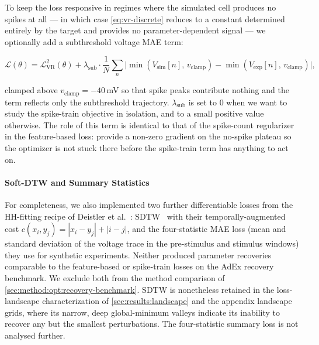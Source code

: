 To keep the loss responsive in regimes where the simulated cell produces no spikes at all --- in which case \cref{eq:vr-discrete} reduces to a constant determined entirely by the target and provides no parameter-dependent signal --- we optionally add a subthreshold voltage \gls{MAE} term:
\begin{strip}
\begin{equation}\label{eq:vr-sub}
    \mathcal{L}(\theta) = \mathcal{L}_{\mathrm{VR}}^{2}(\theta) + \lambda_{\mathrm{sub}} \cdot \frac{1}{N}\sum_{n} \bigl| \min(V_{\mathrm{sim}}[n],\,v_{\mathrm{clamp}}) - \min(V_{\mathrm{exp}}[n],\,v_{\mathrm{clamp}}) \bigr|,
\end{equation}
\end{strip}
clamped above $v_{\mathrm{clamp}} = -40$\,mV so that spike peaks contribute nothing and the term reflects only the subthreshold trajectory.
$\lambda_{\mathrm{sub}}$ is set to $0$ when we want to study the spike-train objective in isolation, and to a small positive value otherwise.
The role of this term is identical to that of the spike-count regularizer in the feature-based loss: provide a non-zero gradient on the no-spike plateau so the optimizer is not stuck there before the spike-train term has anything to act on.

\paragraph{Soft-DTW and Summary Statistics}\label{sec:method:opt:loss:misc}
For completeness, we also implemented two further differentiable losses from the \gls{HH}-fitting recipe of Deistler et al.~\cite{Deistler2025}:
\gls{SDTW}~\cite{Blondel2018} with their temporally-augmented cost $c(x_i, y_j) = |x_i - y_j| + |i - j|$, and the four-statistic \gls{MAE} loss (mean and standard deviation of the voltage trace in the pre-stimulus and stimulus windows) they use for synthetic experiments.
Neither produced parameter recoveries comparable to the feature-based or spike-train losses on the \gls{AdEx} recovery benchmark.
We exclude both from the method comparison of \cref{sec:method:opt:recovery-benchmark}.
\gls{SDTW} is nonetheless retained in the loss-landscape characterization of \cref{sec:results:landscape} and the appendix landscape grids, where its narrow, deep global-minimum valleys indicate its inability to recover any but the smallest perturbations.
The four-statistic summary loss is not analysed further.


